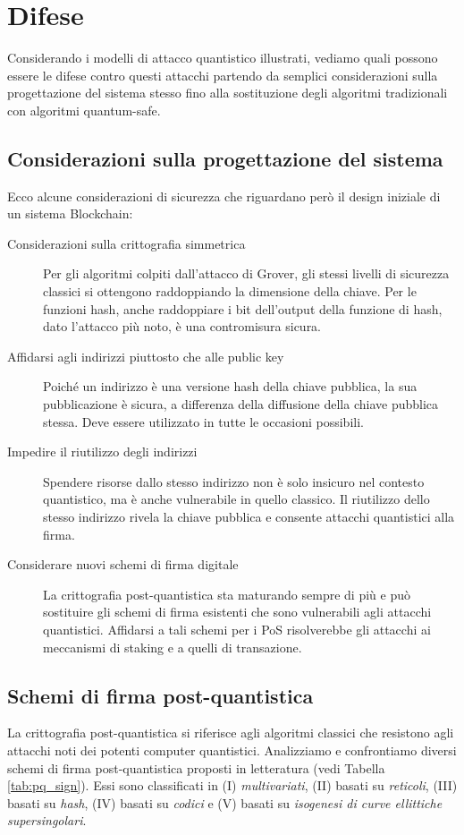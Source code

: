 \section{Difese}
Considerando i modelli di attacco quantistico illustrati, vediamo quali possono essere le difese contro questi attacchi partendo da semplici considerazioni sulla progettazione del sistema stesso fino alla sostituzione degli algoritmi tradizionali con algoritmi quantum-safe.

\subsection{Considerazioni sulla progettazione del sistema}
Ecco alcune considerazioni di sicurezza che riguardano però il design iniziale di un sistema Blockchain:

\begin{description}
  \item [Considerazioni sulla crittografia simmetrica] Per gli algoritmi colpiti dall'attacco di Grover, gli stessi livelli di sicurezza classici si ottengono raddoppiando la dimensione della chiave. Per le funzioni hash, anche raddoppiare i bit dell'output della funzione di hash, dato l'attacco più noto, è una contromisura sicura.
  \item [Affidarsi agli indirizzi piuttosto che alle public key] Poiché un indirizzo è una versione hash della chiave pubblica, la sua pubblicazione è sicura, a differenza della diffusione della chiave pubblica stessa. Deve essere utilizzato in tutte le occasioni possibili.
  \item [Impedire il riutilizzo degli indirizzi] Spendere risorse dallo stesso indirizzo non è solo insicuro nel contesto quantistico, ma è anche vulnerabile in quello classico. Il riutilizzo dello stesso indirizzo rivela la chiave pubblica e consente attacchi quantistici alla firma.
  \item [Considerare nuovi schemi di firma digitale] La crittografia post-quantistica sta maturando sempre di più e può sostituire gli schemi di firma esistenti che sono vulnerabili agli attacchi quantistici. Affidarsi a tali schemi per i PoS risolverebbe gli attacchi ai meccanismi di staking e a quelli di transazione.
\end{description}

\subsection{Schemi di firma post-quantistica}
La crittografia post-quantistica si riferisce agli algoritmi classici che resistono agli attacchi noti dei potenti computer quantistici. Analizziamo e confrontiamo diversi schemi di firma post-quantistica proposti in letteratura (vedi Tabella \ref{tab:pq_sign}). Essi sono classificati in (I) \textit{multivariati}, (II) basati su \textit{reticoli}, (III) basati su \textit{hash}, (IV) basati su \textit{codici} e (V) basati su \textit{isogenesi di curve ellittiche supersingolari}.

